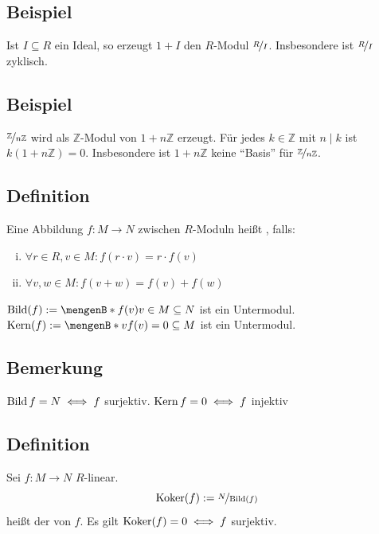 \subsection{Beispiel} %
\label{sub:147}
Ist $I \subseteq R$ ein Ideal, so erzeugt $1+ I$ den $R$-Modul $\nicefrac{R}{I}$. Insbesondere ist $\nicefrac{R}{I}$ zyklisch.

\subsection{Beispiel} %
\label{sub:148}
$\nicefrac{\mathds{Z}}{n \mathds{Z}}$ wird als $\mathds{Z}$-Modul von $1+ n \mathds{Z}$ erzeugt. Für jedes $k \in \mathds{Z}$ mit $n \mid k$ ist $k(1+n \mathds{Z})=0$.
Insbesondere ist $1+ n \mathds{Z}$ keine \enquote{Basis} für $\nicefrac{\mathds{Z}}{n \mathds{Z}}$.

\subsection[Definition: $R$-linear]{Definition} %
\label{sub:149}
Eine Abbildung $f : M  \to N$ zwischen $R$-Moduln heißt , falls:
\begin{enumerate}[(i)]
	\item $\forall r \in R, v \in M : f(r \cdot v) = r \cdot f(v) $
	\item $\forall v,w \in M : f(v+w) = f(v) + f(w)$
\end{enumerate}
$\bild (f) := \set[f(v)]{v \in M} \subseteq N $ ist ein Untermodul. \\
$\Kern (f) := \set[v]{f(v) =0} \subseteq M $ ist ein Untermodul.

\subsection{Bemerkung} %
\label{sub:1410}
$\bild f = N \iff f$ surjektiv. $\Kern f = 0 \iff f$ injektiv

\subsection[Definition: Kokern]{Definition} %
\label{sub:1411}
Sei $f : M \to N$ $R$-linear. 
\[
	\koker (f) := \nicefrac{N}{\bild (f)}
\]
heißt der  von $f$. Es gilt $\koker (f) = 0 \iff f$ surjektiv.

